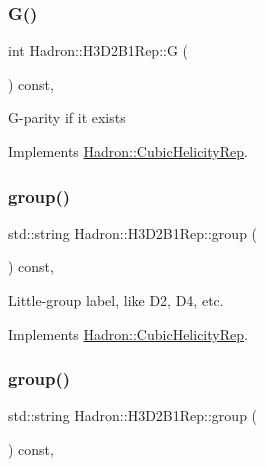 \subsubsection{\texorpdfstring{G()}{G()}\hspace{0.1cm}{\footnotesize\ttfamily [3/3]}}
{\footnotesize\ttfamily int Hadron\+::\+H3\+D2\+B1\+Rep\+::G (\begin{DoxyParamCaption}{ }\end{DoxyParamCaption}) const\hspace{0.3cm}{\ttfamily [inline]}, {\ttfamily [virtual]}}

G-\/parity if it exists 

Implements \mbox{\hyperlink{structHadron_1_1CubicHelicityRep_a50689f42be1e6170aa8cf6ad0597018b}{Hadron\+::\+Cubic\+Helicity\+Rep}}.

\mbox{\label{structHadron_1_1H3D2B1Rep_a6fa498fcad9f73335cba8e82709d663d}} 
\subsubsection{\texorpdfstring{group()}{group()}\hspace{0.1cm}{\footnotesize\ttfamily [1/5]}}
{\footnotesize\ttfamily std\+::string Hadron\+::\+H3\+D2\+B1\+Rep\+::group (\begin{DoxyParamCaption}{ }\end{DoxyParamCaption}) const\hspace{0.3cm}{\ttfamily [inline]}, {\ttfamily [virtual]}}

Little-\/group label, like D2, D4, etc. 

Implements \mbox{\hyperlink{structHadron_1_1CubicHelicityRep_a101a7d76cd8ccdad0f272db44b766113}{Hadron\+::\+Cubic\+Helicity\+Rep}}.

\mbox{\label{structHadron_1_1H3D2B1Rep_a6fa498fcad9f73335cba8e82709d663d}} 
\subsubsection{\texorpdfstring{group()}{group()}\hspace{0.1cm}{\footnotesize\ttfamily [2/5]}}
{\footnotesize\ttfamily std\+::string Hadron\+::\+H3\+D2\+B1\+Rep\+::group (\begin{DoxyParamCaption}{ }\end{DoxyParamCaption}) const\hspace{0.3cm}{\ttfamily [inline]}, {\ttfamily [virtual]}}

